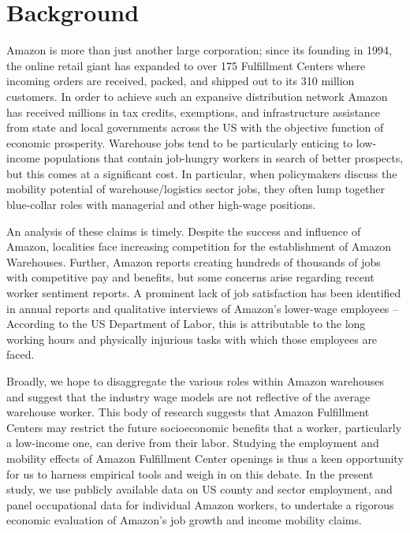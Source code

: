 \documentclass[11pt]{article}
\begin{document}
\section{Background}
\-\hspace{0.5cm} Amazon is more than just another large corporation; since its founding in 1994, the online retail giant has expanded to over 175 Fulfillment Centers where incoming orders are received, packed, and shipped out to its 310 million customers. In order to achieve such an expansive distribution network Amazon has received millions in tax credits, exemptions, and infrastructure assistance from state and local governments across the US with the objective function of  economic prosperity. Warehouse jobs tend to be particularly enticing to low-income populations that contain job-hungry workers in search of better prospects, but this comes at a significant cost. In particular, when policymakers discuss the mobility potential of warehouse/logistics sector jobs, they often lump together blue-collar roles with managerial and other high-wage positions. 

\-\hspace{0.5cm} An analysis of these claims is timely. Despite the success and influence of Amazon, localities face increasing competition for the establishment of Amazon Warehouses. Further, Amazon reports creating hundreds of thousands of jobs with competitive pay and benefits, but some concerns arise regarding recent worker sentiment reports. A prominent lack of job satisfaction has been identified in annual reports and qualitative interviews of Amazon's lower-wage employees -- According to the US Department of Labor, this is attributable to the long working hours and physically injurious tasks with which those employees are faced. 

\-\hspace{0.5cm} Broadly, we hope to disaggregate the various roles within Amazon warehouses and suggest that the industry wage models are not reflective of the average warehouse worker. This body of research suggests that Amazon Fulfillment Centers may restrict the future socioeconomic benefits that a worker, particularly a low-income one, can derive from their labor. Studying the employment and mobility effects of Amazon Fulfillment Center openings is thus a keen opportunity for us to harness empirical tools and weigh in on this debate. In the present study, we use publicly available data on US county and sector employment, and panel occupational data for individual Amazon workers, to undertake a rigorous economic evaluation of Amazon's job growth and income mobility claims.
\clearpage 
\end{document}
